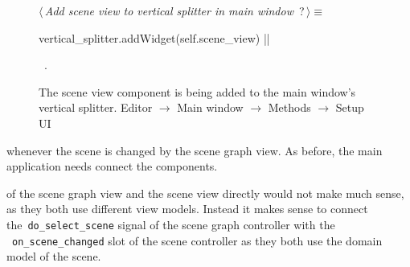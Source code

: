 \documentclass[%
    a4paper,    %
    justified,  %
    nobib,      %
    openany     %
]{tufte-book}
\begin{document}
\begin{figure}
\begin{flushleft} \small
\begin{minipage}{\linewidth}\label{scrap84}\raggedright\small
{} $\langle\,${\itshape Add scene view to vertical splitter in main window}\nobreak\ {\footnotesize {?}}$\,\rangle\equiv$
\vspace{-1ex}
\begin{pythoncode}
vertical_splitter.addWidget(self.scene_view)
|\NWsep|
\end{pythoncode}
\vspace{1.5ex}
\footnotesize
\begin{list}{}{\setlength{\itemsep}{-\parsep}\setlength{\itemindent}{-\leftmargin}}
\item \NWtxtMacroRefIn\ .

\item{}
\end{list}
\end{minipage}\vspace{4ex}
\end{flushleft}
\caption{The scene view component is being added to the main window's vertical
  splitter.
  \newline{}\newline{}Editor $\rightarrow$ Main window $\rightarrow$
  Methods $\rightarrow$ Setup UI}
\label{editor:lst:main-window:methods:setup-ui:add-scene-view-to-splitter}
\end{figure}

 whenever the scene is
changed by the scene graph view. As before, the main application needs connect
the components.

 of the scene graph view and the scene
view directly would not make much sense, as they both use different view models.
Instead it makes sense to connect the~\verb=do_select_scene= signal of the scene
graph controller with the ~\verb=on_scene_changed= slot of the scene controller
as they both use the domain model of the scene.
\end{document}
